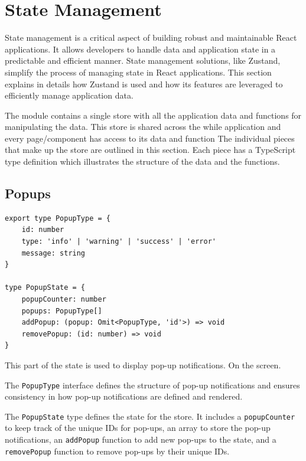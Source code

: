 \section{State Management}
\label{sec:state}

State management is a critical aspect of building robust and maintainable React applications. It allows developers to handle data and application state in a predictable and efficient manner. State management solutions, like Zustand, simplify the process of managing state in React applications.\cite{zustand-setup} This section explains in details how Zustand is used and how its features are leveraged to efficiently manage application data.

The module contains a single store with all the application data and functions for manipulating the data. This store is shared across the while application and every page/component has access to its data and function The individual pieces that make up the store are outlined in this section. Each piece has a TypeScript type definition which illustrates the structure of the data and the functions.

\subsection{Popups}
\begin{verbatim}
export type PopupType = {
    id: number
    type: 'info' | 'warning' | 'success' | 'error'
    message: string
}

type PopupState = {
    popupCounter: number
    popups: PopupType[]
    addPopup: (popup: Omit<PopupType, 'id'>) => void
    removePopup: (id: number) => void
}
\end{verbatim}

This part of the state is used to display pop-up notifications. On the screen.

The \texttt{PopupType} interface defines the structure of pop-up notifications and ensures consistency in how pop-up notifications are defined and rendered.

The \texttt{PopupState} type defines the state for the store. It includes a \texttt{popupCounter} to keep track of the unique IDs for pop-ups, an array to store the pop-up notifications, an \texttt{addPopup} function to add new pop-ups to the state, and a \texttt{removePopup} function to remove pop-ups by their unique IDs.

